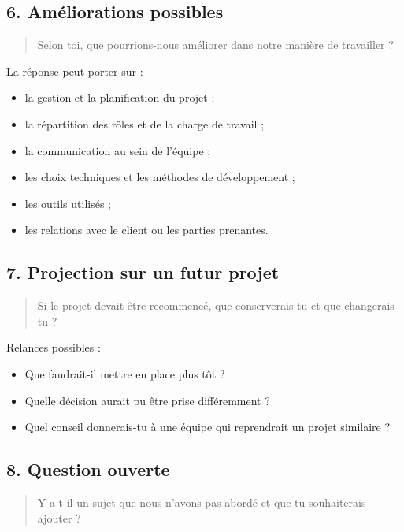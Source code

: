 \subsection*{6. Améliorations possibles}

\begin{quote}
Selon toi, que pourrions-nous améliorer dans notre manière de travailler ?
\end{quote}

La réponse peut porter sur :

\begin{itemize}
    \item la gestion et la planification du projet ;
    \item la répartition des rôles et de la charge de travail ;
    \item la communication au sein de l'équipe ;
    \item les choix techniques et les méthodes de développement ;
    \item les outils utilisés ;
    \item les relations avec le client ou les parties prenantes.
\end{itemize}

\subsection*{7. Projection sur un futur projet}

\begin{quote}
Si le projet devait être recommencé, que conserverais-tu et que changerais-tu ?
\end{quote}

Relances possibles :

\begin{itemize}
    \item Que faudrait-il mettre en place plus tôt ?
    \item Quelle décision aurait pu être prise différemment ?
    \item Quel conseil donnerais-tu à une équipe qui reprendrait un projet similaire ?
\end{itemize}

\subsection*{8. Question ouverte}

\begin{quote}
Y a-t-il un sujet que nous n'avons pas abordé et que tu souhaiterais ajouter ?
\end{quote}

